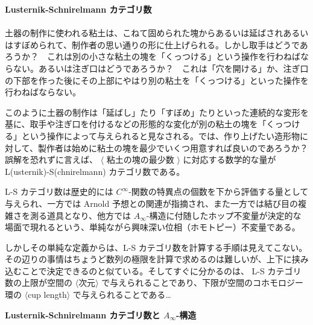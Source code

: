 \documentclass[uplatex,dvipdfmx]{jlreq}
\begin{document}
\noindent
{\large\bfseries Lusternik-Schnirelmann カテゴリ数}\\
~\hspace*{\fill}{\large\bfseries 岩瀬 則夫（九大・数理）}\\

土器の制作に使われる粘土は、こねて固められた塊からあるいは延ばされあるいはすぼめられて、制作者の思い通りの形に仕上げられる。しかし取手はどうであろうか？　これは別の小さな粘土の塊を「くっつける」という操作を行わねばならない。あるいは注ぎ口はどうであろうか？　これは「穴を開ける」か、注ぎ口の下部を作った後にその上部にやはり別の粘土を「くっつける」といった操作を行わねばならない。

このように土器の制作は「延ばし」たり「すぼめ」たりといった連続的な変形を基に、取手や注ぎ口を付けるなどの形態的な変化が別の粘土の塊を「くっつける」という操作によって与えられると見なされる。では、作り上げたい造形物に対して、製作者は始めに粘土の塊を最少でいくつ用意すれば良いのであろうか？　誤解を恐れずに言えば、
$\langle$ 粘土の塊の最少数 $\rangle$ に対応する数学的な量が
L(usternik)-S(chnirelmann) カテゴリ数である。

L-S カテゴリ数は歴史的には $C^\infty$-関数の特異点の個数を下から評価する量として与えられ、一方では Arnold 予想との関連が指摘され、また一方では結び目の複雑さを測る道具となり、他方では $A_\infty$-構造に付随したホップ不変量が決定的な場面で現れるという、単純ながら興味深い位相（ホモトピー）不変量である。

しかしその単純な定義からは、L-S カテゴリ数を計算する手順は見えてこない。その辺りの事情はちょうど数列の極限を計算で求めるのは難しいが、上下に挟み込むことで決定できるのと似ている。そしてすぐに分かるのは、
L-S カテゴリ数の上限が空間の $\langle$次元$\rangle$ で与えられることであり、下限が空間のコホモロジー環の $\langle$cup length$\rangle$ で与えられることである…

\newpage
\noindent
{\large\bfseries Lusternik-Schnirelmann カテゴリ数と $A_\infty$-構造}\\
~\hspace*{\fill}{\large\bfseries 岩瀬 則夫（九大・数理）}\\
\end{document}
